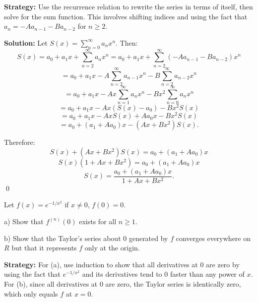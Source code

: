 \noindent\textbf{Strategy:} Use the recurrence relation to rewrite the series in terms of itself, then solve for the sum function. This involves shifting indices and using the fact that \( a_n = -Aa_{n-1} - Ba_{n-2} \) for \( n \geq 2 \).

\bigskip\noindent\textbf{Solution:} Let \( S(x) = \sum_{n=0}^{\infty} a_nx^n \). Then:
\[S(x) = a_0 + a_1x + \sum_{n=2}^{\infty} a_nx^n = a_0 + a_1x + \sum_{n=2}^{\infty} (-Aa_{n-1} - Ba_{n-2})x^n\]
\[= a_0 + a_1x - A\sum_{n=2}^{\infty} a_{n-1}x^n - B\sum_{n=2}^{\infty} a_{n-2}x^n\]
\[= a_0 + a_1x - Ax\sum_{n=1}^{\infty} a_nx^n - Bx^2\sum_{n=0}^{\infty} a_nx^n\]
\[= a_0 + a_1x - Ax(S(x) - a_0) - Bx^2S(x)\]
\[= a_0 + a_1x - AxS(x) + Aa_0x - Bx^2S(x)\]
\[= a_0 + (a_1 + Aa_0)x - (Ax + Bx^2)S(x).\]

Therefore:
\[S(x) + (Ax + Bx^2)S(x) = a_0 + (a_1 + Aa_0)x\]
\[S(x)(1 + Ax + Bx^2) = a_0 + (a_1 + Aa_0)x\]
\[S(x) = \frac{a_0 + (a_1 + Aa_0)x}{1 + Ax + Bx^2}.\]\qed


\begin{problembox}
\begin{problemstatement}
Let \( f(x) = e^{-1/x^2} \) if \( x \neq 0 \), \( f(0) = 0 \).

a) Show that \( f^{(n)}(0) \) exists for all \( n \geq 1 \).

b) Show that the Taylor's series about 0 generated by \( f \) converges everywhere on \( R \) but that it represents \( f \) only at the origin.
\end{problemstatement}
\end{problembox}

\noindent\textbf{Strategy:} For (a), use induction to show that all derivatives at 0 are zero by using the fact that \( e^{-1/x^2} \) and its derivatives tend to 0 faster than any power of \( x \). For (b), since all derivatives at 0 are zero, the Taylor series is identically zero, which only equals \( f \) at \( x = 0 \).


